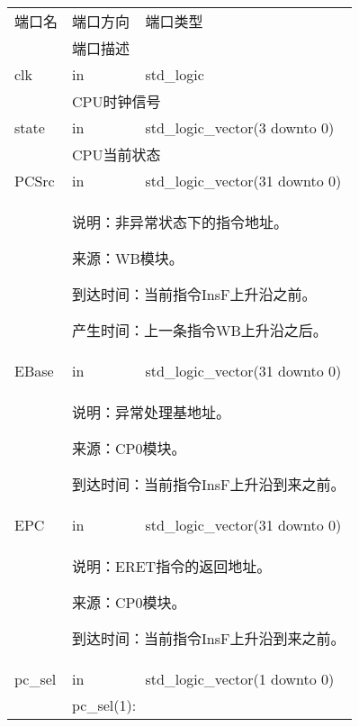         \begin{tabularx}{\textwidth}{lll}
            \toprule
            端口名          & 端口方向  & 端口类型 \\
            \cmidrule(l){2-3}
            &
            \multicolumn{2}{X}{端口描述} \\
            \midrule
            clk             & in        & std\_logic \\
            \cmidrule(l){2-3}
            &
            \multicolumn{2}{X}{
                CPU时钟信号
            } \\
            \midrule
            state           & in        & std\_logic\_vector(3 downto 0) \\
            \cmidrule(l){2-3}
            &
            \multicolumn{2}{X}{
                CPU当前状态
            } \\
            \midrule
            PCSrc           & in        & std\_logic\_vector(31 downto 0) \\
            \cmidrule(l){2-3}
            &
            \multicolumn{2}{X}{
                说明：非异常状态下的指令地址。

                来源：WB模块。

                到达时间：当前指令InsF上升沿之前。

                产生时间：上一条指令WB上升沿之后。
            } \\
            \midrule
            EBase           & in        & std\_logic\_vector(31 downto 0) \\
            \cmidrule(l){2-3}
            &
            \multicolumn{2}{X}{
                说明：异常处理基地址。

                来源：CP0模块。

                到达时间：当前指令InsF上升沿到来之前。
            } \\
            \midrule
            EPC             & in        & std\_logic\_vector(31 downto 0) \\
            \cmidrule(l){2-3}
            &
            \multicolumn{2}{X}{
                说明：ERET指令的返回地址。

                来源：CP0模块。

                到达时间：当前指令InsF上升沿到来之前。
            } \\
            \midrule
            pc\_sel         & in        & std\_logic\_vector(1 downto 0) \\
            \cmidrule(l){2-3}
            &
            \multicolumn{2}{X}{
                pc\_sel(1):

}
\end{tabularx}
